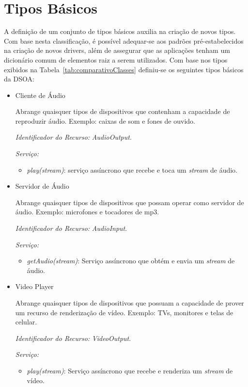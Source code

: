 \section{Tipos Básicos}
\label{sec:tiposBasicos}

A definição de um conjunto de tipos básicos auxilia na criação de novos tipos. Com base nesta classificação, é possível adequar-se aos padrões pré-estabelecidos na criação de novos drivers, além de assegurar que as aplicações tenham um dicionário comum de elementos raiz a serem utilizados. Com base nos tipos exibidos na Tabela~\ref{tab:comparativoClasses} definiu-se os seguintes tipos básicos da DSOA:

\begin{itemize}
	\item Cliente de Áudio
		
		Abrange quaisquer tipos de dispositivos que contenham a capacidade de reproduzir áudio. Exemplo: caixas de som e fones de ouvido.

		\emph{Identificador do Recurso:} \emph{AudioOutput}.

		\emph{Serviço:}
		\begin{itemize}
			\item \emph{play(stream)}: serviço assíncrono que recebe e toca um \emph{stream} de áudio.
		\end{itemize}

	\item Servidor de Áudio
		
		Abrange quaisquer tipos de dispositivos que possam operar como servidor de áudio. Exemplo: microfones e tocadores de mp3.

		\emph{Identificador do Recurso:} \emph{AudioInput}.

		\emph{Serviço:}
		\begin{itemize}
			\item \emph{getAudio(stream)}: Serviço assíncrono que obtém e envia um \emph{stream} de áudio.
		\end{itemize}

	\item Video Player
		
		Abrange quaisquer tipos de dispositivos que possuam a capacidade de prover um recurso de renderização de vídeo. Exemplo: TVs, monitores e telas de celular.

		\emph{Identificador do Recurso:} \emph{VideoOutput}.

		\emph{Serviço:} 
		\begin{itemize}
			\item \emph{play(stream)}: Serviço assíncrono que recebe e renderiza um \emph{stream} de vídeo.
		\end{itemize}


\end{itemize}
